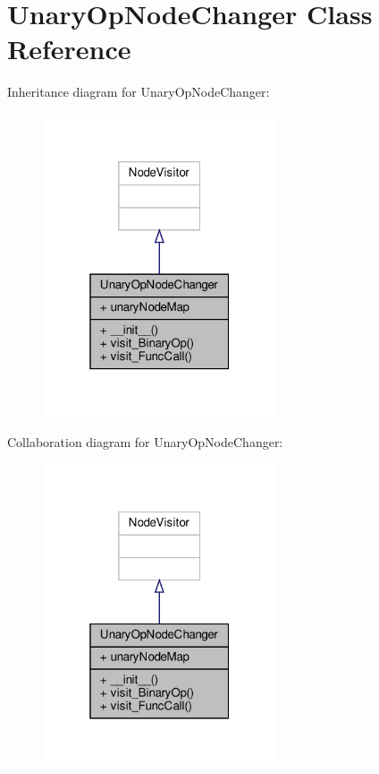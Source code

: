 \hypertarget{classPostProcessor_1_1Visitor_1_1UnaryOpNodeChanger}{}\section{Unary\+Op\+Node\+Changer Class Reference}
\label{classPostProcessor_1_1Visitor_1_1UnaryOpNodeChanger}


Inheritance diagram for Unary\+Op\+Node\+Changer\+:\nopagebreak
\begin{figure}[H]
\begin{center}
\leavevmode
\includegraphics[width=196pt]{classPostProcessor_1_1Visitor_1_1UnaryOpNodeChanger__inherit__graph}
\end{center}
\end{figure}


Collaboration diagram for Unary\+Op\+Node\+Changer\+:\nopagebreak
\begin{figure}[H]
\begin{center}
\leavevmode
\includegraphics[width=196pt]{classPostProcessor_1_1Visitor_1_1UnaryOpNodeChanger__coll__graph}
\end{center}
\end{figure}
